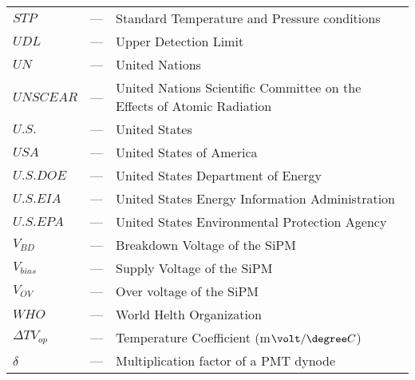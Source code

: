 \begin{longtable}{p{25mm} c p{120mm} }
$STP$ & --- & Standard Temperature and Pressure conditions\\
$UDL$ & --- & Upper Detection Limit\\
$UN$ & --- & United Nations\\
$UNSCEAR$ & --- & United Nations Scientific Committee on the Effects of Atomic Radiation\\
$U.S.$ & --- & United States\\
$USA$ & --- & United States of America\\
$U.S. DOE$ & --- & United States Department of Energy\\
$U.S. EIA$ & --- & United States Energy Information Administration\\
$U.S. EPA$ & --- & United States Environmental Protection Agency\\
$V_{BD}$ & --- & Breakdown Voltage of the SiPM\\
$V_{bias}$ & --- & Supply Voltage of the SiPM\\
$V_{OV}$ & --- & Over voltage of the SiPM\\
$WHO$ & --- & World Helth Organization\\
$\Delta TV_{op}$ & --- & Temperature Coefficient (m$\volt/\degree C$)\\
$\delta$ & --- & Multiplication factor of a PMT dynode\\


\end{longtable}
